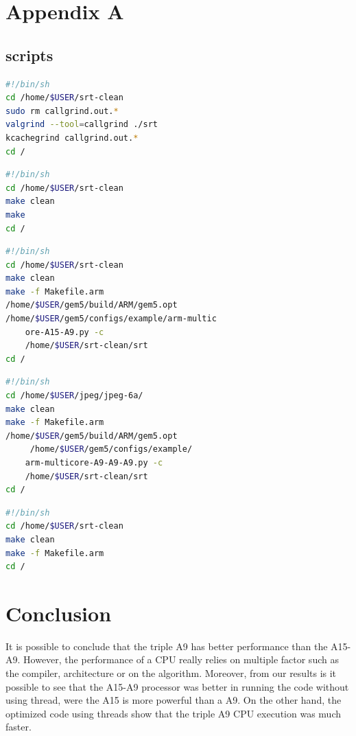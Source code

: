 \documentclass[journal]{IEEEtran}
\begin{document}
\section{Appendix A}
\subsection{scripts}
\begin{lstlisting}[language=bash,caption={bash}]
#!/bin/sh
cd /home/$USER/srt-clean
sudo rm callgrind.out.*
valgrind --tool=callgrind ./srt
kcachegrind callgrind.out.*
cd /
\end{lstlisting}

\begin{lstlisting}[language=bash,caption={bash}]
#!/bin/sh
cd /home/$USER/srt-clean
make clean
make
cd /
\end{lstlisting}

\begin{lstlisting}[language=bash,caption={bash}]
#!/bin/sh
cd /home/$USER/srt-clean
make clean
make -f Makefile.arm
/home/$USER/gem5/build/ARM/gem5.opt
/home/$USER/gem5/configs/example/arm-multic
	ore-A15-A9.py -c
	/home/$USER/srt-clean/srt
cd /
\end{lstlisting}

\begin{lstlisting}[language=bash,caption={bash}]
#!/bin/sh
cd /home/$USER/jpeg/jpeg-6a/
make clean
make -f Makefile.arm
/home/$USER/gem5/build/ARM/gem5.opt
	 /home/$USER/gem5/configs/example/
	arm-multicore-A9-A9-A9.py -c 
	/home/$USER/srt-clean/srt
cd /
\end{lstlisting}


\begin{lstlisting}[language=bash,caption={bash}]
#!/bin/sh
cd /home/$USER/srt-clean
make clean
make -f Makefile.arm
cd /
\end{lstlisting}



\section{Conclusion}
It is possible to conclude that the triple A9 has better performance than the A15-A9. However, the performance of a CPU really relies on multiple factor such as the compiler, architecture or on the algorithm. Moreover, from our results is it possible to see that the A15-A9 processor was better in running the code without using thread, were the A15 is more powerful than a A9. On the other hand, the optimized code using threads show that the triple A9 CPU execution was much faster.
\end{document}
